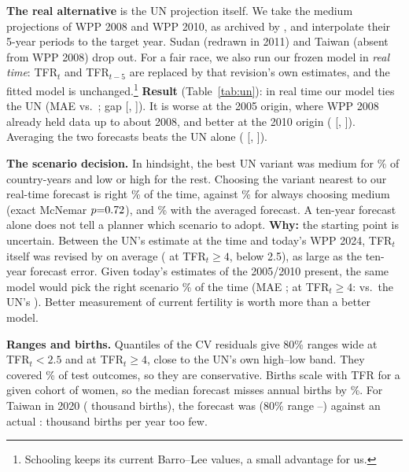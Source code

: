 \documentclass[11pt]{article}
\begin{document}
\textbf{The real alternative} is the UN projection itself. We take the medium projections of WPP 2008 and WPP 2010, as archived by \citet{sevcikova2014wpp2008,sevcikova2013wpp2010}, and interpolate their 5-year periods to the target year. Sudan (redrawn in 2011) and Taiwan (absent from WPP 2008) drop out. For a fair race, we also run our frozen model in \emph{real time}: TFR$_t$ and TFR$_{t-5}$ are replaced by that revision's own estimates, and the fitted model is unchanged.\footnote{Schooling keeps its current Barro--Lee values, a small advantage for us.} \textbf{Result} (Table~\ref{tab:un}): in real time our model ties the UN (MAE \unMaeRt{} vs.\ \unMaeUn; gap \unGapAll{} [\unGapAllLo, \unGapAllHi]). It is worse at the 2005 origin, where WPP 2008 already held data up to about 2008, and better at the 2010 origin (\unGapB{} [\unGapBLo, \unGapBHi]). Averaging the two forecasts beats the UN alone (\unAvgGap{} [\unAvgGapLo, \unAvgGapHi]).

\textbf{The scenario decision.} In hindsight, the best UN variant was medium for \scenMed\% of country-years and low or high for the rest. Choosing the variant nearest to our real-time forecast is right \scenRt\% of the time, against \scenMed\% for always choosing medium (exact McNemar $p{=}0.72$), and \scenAvg\% with the averaged forecast. A ten-year forecast alone does not tell a planner which scenario to adopt. \textbf{Why:} the starting point is uncertain. Between the UN's estimate at the time and today's WPP 2024, TFR$_t$ itself was revised by \revAll{} on average (\revHigh{} at TFR$_t\ge4$, \revLow{} below 2.5), as large as the ten-year forecast error. Given today's estimates of the 2005/2010 present, the same model would pick the right scenario \scenRev\% of the time (MAE \unMaeRev; at TFR$_t\ge4$: \unHighRev{} vs.\ the UN's \unHighUn). Better measurement of current fertility is worth more than a better model.

\textbf{Ranges and births.} Quantiles of the CV residuals give 80\% ranges \piWidthLow{} wide at TFR$_t<2.5$ and \piWidthHigh{} at TFR$_t\ge4$, close to the UN's own high--low band. They covered \piCov\% of test outcomes, so they are conservative. Births scale with TFR for a given cohort of women, so the median forecast misses annual births by \birthsMedErr\%. For Taiwan in 2020 (\twBirths{} thousand births), the forecast was \eaTwnP{} (80\% range \twLo--\twHi) against an actual \eaTwnY: \twBirthsErr{} thousand births per year too few.

\end{document}
